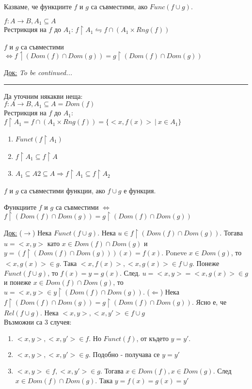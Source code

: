 \documentclass[fleqn, titlepage, 12pt]{report}
\begin{document}
 Казваме, че функциите $f$ и $g$ са съвместими, ако $Func(f \cup g)$.
\bigbreak

$f: A \rightarrow B, A_1 \subseteq A$\\
Рестрикция на $f$ до $A_1$: $f \upharpoonright A_1 \leftrightharpoons f \cap (A_1 \times Rng(f))$
\bigbreak

 $f$ и $g$ са съвместими $\Longleftrightarrow f\upharpoonleft(Dom(f) \cap Dom(g)) = g \upharpoonright (Dom(f) \cap Dom(g))$
\bigbreak

\underline{Док:} \textit{To be continued...}\\
\bigbreak
\hrule
\bigbreak
Да уточним някакви неща: \\
$ f : A \rightarrow B, A_1 \subseteq A = Dom(f) $\\
Рестрикция на $f$ до $ A_1 $: $ f \upharpoonright A_1 = f \cap (A_1 \times Rng(f)) = \{<x,f(x)>\ |\ x \in A_1\}  $
\begin{enumerate}
  \item $ Funct(f \upharpoonright A_1) $
  \item $ f \upharpoonright A_1 \subseteq f \upharpoonright A$
  \item $ A_1 \subseteq A2 \subseteq A \Rightarrow f \upharpoonright A_1 \subseteq f \upharpoonright A_2$
\end{enumerate}
\bigbreak

 $ f $ и $ g $ са съвместими функции, ако $f \cup g$ е функция.
\bigbreak

 Функциите $f$ и $ g $ са съвместими $ \Leftrightarrow  $ $f \upharpoonright (Dom(f) \cap Dom(g)) =
g \upharpoonright (Dom(f) \cap Dom(g))$
\bigbreak

\underline{Док:} ($ \rightarrow $) Нека $Funct(f \cup g)$. Нека $ u \in f \upharpoonright (Dom(f) \cap Dom(g))$.
Тогава $u = <x,y>$ като $ x \in Dom(f) \cap Dom(g)$ и $ y = (f \upharpoonright (Dom(f) \cap Dom(g)))(x) = f(x) $.
Poneve $x \in Dom(g)$, то $ <x,g(x)> \in g $. Така $<x,f(x)>, <x,g(x)> \in f \cup g$. Понеже $Funct(f \cup g)$,
то $f(x) = y = g(x)$. След. $u = <x,y> = <x,g(x)> \in g$ и понеже $x \in Dom(f) \cap Dom(g)$,
то $u = <x,y> \in y \upharpoonright (Dom(f) \cap Dom(g))$.
\bigbreak
($\Leftarrow$) Нека $f \upharpoonright (Dom(f) \cap Dom(g)) = g \upharpoonright (Dom(f) \cap Dom(g))$.
Ясно е, че $Rel(f \cup g)$. Нека $<x,y>, <x,y'> \in f \cup g$ \\
Възможни са 3 случея:
\begin{enumerate}
  \item $<x,y>, <x,y'> \in f$. Но $Funct(f)$, от където $y = y'$.
  \item $<x,y>,<x,y'> \in g$. Подобно - получава се $y = y'$
  \item $<x,y> \in f , <x,y'> \in g$. Тогава $x \in Dom(f), x \in Dom(g)$. След $x \in Dom(f) \cap Dom(g)$.
    Така $y = f(x) = g(x) = y'$
\end{enumerate}
\bigbreak
\end{document}
